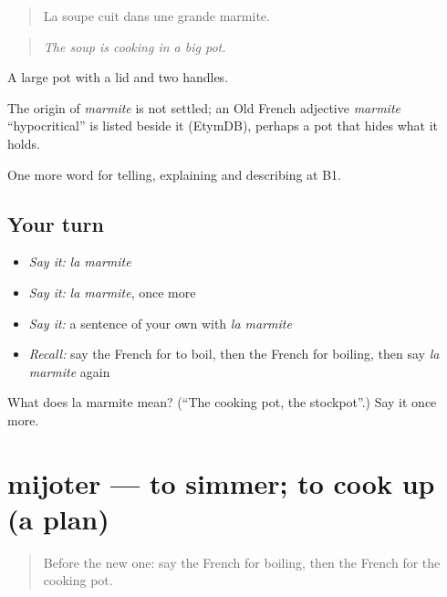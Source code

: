 \begin{quote}
La soupe cuit dans une grande marmite.
\end{quote}

\begin{quote}
\emph{The soup is cooking in a big pot.}
\end{quote}

A large pot with a lid and two handles.

\begin{cousinweb}
The origin of \emph{marmite} is not settled; an Old French adjective \emph{marmite} \textquotedblleft{}hypocritical\textquotedblright{} is listed beside it (EtymDB), perhaps a pot that hides what it holds.
\end{cousinweb}

\begin{grammarlens}[title={What you've built}]
One more word for telling, explaining and describing at B1.
\end{grammarlens}

\subsection*{Your turn}
\begin{itemize}
\raggedright
  \item \emph{Say it:} \emph{la marmite}
  \item \emph{Say it:} \emph{la marmite}, once more
  \item \emph{Say it:} a sentence of your own with \emph{la marmite}
  \item \emph{Recall:} say the French for to boil, then the French for boiling, then say \emph{la marmite} again
\end{itemize}

\begin{tcolorbox}[breakable,colback=teal!4,colframe=teal!35!black,title={Before you move on}]
What does la marmite mean? (\textquotedblleft{}The cooking pot, the stockpot\textquotedblright{}.) Say it once more.
\end{tcolorbox}
\section[mijoter]{mijoter — to simmer; to cook up (a plan)}

\label{lesson:FR-C330-mijoter}



\begin{quote}
Before the new one: say the French for boiling, then the French for the cooking pot.
\end{quote}

